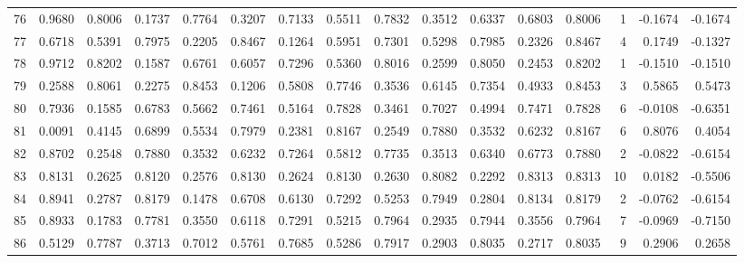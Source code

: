 \begin{tabular}{lrrrrrrrrrrrrrrr}
76  &      0.9680 &  0.8006 &  0.1737 &  0.7764 &  0.3207 &  0.7133 &  0.5511 &  0.7832 &  0.3512 &  0.6337 &   0.6803 &     0.8006 &      1 &                   -0.1674 &                    -0.1674 \\
77  &      0.6718 &  0.5391 &  0.7975 &  0.2205 &  0.8467 &  0.1264 &  0.5951 &  0.7301 &  0.5298 &  0.7985 &   0.2326 &     0.8467 &      4 &                    0.1749 &                    -0.1327 \\
78  &      0.9712 &  0.8202 &  0.1587 &  0.6761 &  0.6057 &  0.7296 &  0.5360 &  0.8016 &  0.2599 &  0.8050 &   0.2453 &     0.8202 &      1 &                   -0.1510 &                    -0.1510 \\
79  &      0.2588 &  0.8061 &  0.2275 &  0.8453 &  0.1206 &  0.5808 &  0.7746 &  0.3536 &  0.6145 &  0.7354 &   0.4933 &     0.8453 &      3 &                    0.5865 &                     0.5473 \\
80  &      0.7936 &  0.1585 &  0.6783 &  0.5662 &  0.7461 &  0.5164 &  0.7828 &  0.3461 &  0.7027 &  0.4994 &   0.7471 &     0.7828 &      6 &                   -0.0108 &                    -0.6351 \\
81  &      0.0091 &  0.4145 &  0.6899 &  0.5534 &  0.7979 &  0.2381 &  0.8167 &  0.2549 &  0.7880 &  0.3532 &   0.6232 &     0.8167 &      6 &                    0.8076 &                     0.4054 \\
82  &      0.8702 &  0.2548 &  0.7880 &  0.3532 &  0.6232 &  0.7264 &  0.5812 &  0.7735 &  0.3513 &  0.6340 &   0.6773 &     0.7880 &      2 &                   -0.0822 &                    -0.6154 \\
83  &      0.8131 &  0.2625 &  0.8120 &  0.2576 &  0.8130 &  0.2624 &  0.8130 &  0.2630 &  0.8082 &  0.2292 &   0.8313 &     0.8313 &     10 &                    0.0182 &                    -0.5506 \\
84  &      0.8941 &  0.2787 &  0.8179 &  0.1478 &  0.6708 &  0.6130 &  0.7292 &  0.5253 &  0.7949 &  0.2804 &   0.8134 &     0.8179 &      2 &                   -0.0762 &                    -0.6154 \\
85  &      0.8933 &  0.1783 &  0.7781 &  0.3550 &  0.6118 &  0.7291 &  0.5215 &  0.7964 &  0.2935 &  0.7944 &   0.3556 &     0.7964 &      7 &                   -0.0969 &                    -0.7150 \\
86  &      0.5129 &  0.7787 &  0.3713 &  0.7012 &  0.5761 &  0.7685 &  0.5286 &  0.7917 &  0.2903 &  0.8035 &   0.2717 &     0.8035 &      9 &                    0.2906 &                     0.2658 \\

\end{tabular}
